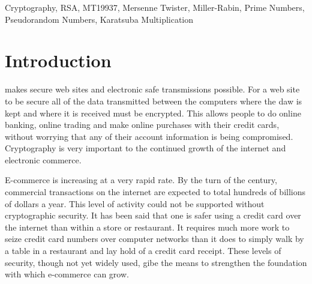 \documentclass[conference]{IEEEtran}
\begin{document}
\begin{IEEEkeywords}
Cryptography, RSA, MT19937, Mersenne Twister, Miller-Rabin, Prime Numbers, Pseudorandom Numbers, Karatsuba Multiplication
\end{IEEEkeywords}






%
\IEEEpeerreviewmaketitle



\section{{\LARGE Introduction}}
% 
% 
% 
% 
 makes secure web sites and electronic safe transmissions possible. For a web site to be secure all of the data transmitted between the computers where the daw is kept and where it is received must be encrypted. This allows people to do online banking, online trading and make online purchases with their credit cards, without worrying that any of their account information is being compromised. Cryptography is very important to the continued growth of the internet and electronic commerce.

E-commerce is increasing at a very rapid rate. By the turn of the century, commercial transactions on the internet are expected to total hundreds of billions of dollars a year. This level of activity could not be supported without cryptographic security. It has been said that one is safer using a credit card over the internet than within a store or restaurant. It requires much more work to seize credit card numbers over computer networks than it does to simply walk by a table in a restaurant and lay hold of a credit card receipt. These levels of security, though not yet widely used, gibe the means to strengthen the foundation with which e-commerce can grow.
\end{document}
